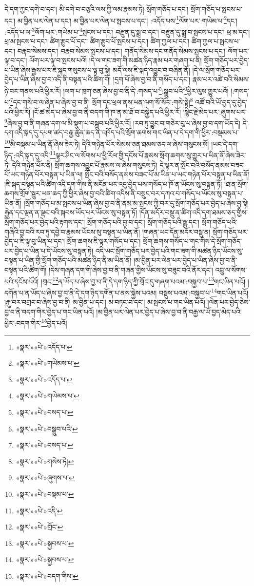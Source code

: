 དེ་དག་ཀྱང་དགེ་བ་དང་། མི་དགེ་བ་བཅུའི་ལས་ཀྱི་ལམ་རྣམས་ཏེ། སྲོག་གཅོད་པ་དང་། སྲོག་གཅོད་པ་སྤངས་པ་དང་། མ་བྱིན་པར་ལེན་པ་དང་། མ་བྱིན་པར་ལེན་པ་སྤངས་པ་དང་། :འདོད་པས་\footnote{«སྣར་»«པེ་»འདོད་པ་}ལོག་པར་:གཡེམ་པ་\footnote{«སྣར་»«པེ་»གཡེམས་པ་}དང་། :འདོད་པ་ལ་\footnote{«སྣར་»«པེ་»འདོད་པ་}ལོག་པར་:གཡེམ་པ་\footnote{«སྣར་»«པེ་»གཡེམས་པ་}སྤངས་པ་དང་། བརྫུན་དུ་སྨྲ་བ་དང་། བརྫུན་དུ་སྨྲ་བ་སྤངས་པ་དང་། ཕྲ་མ་དང་། ཕྲ་མ་སྤངས་པ་དང་། ཚིག་རྩུབ་པོ་དང་། ཚིག་རྩུབ་པོ་སྤངས་པ་དང་། ཚིག་ཀྱལ་པ་དང་། ཚིག་ཀྱལ་པ་སྤངས་པ་དང་། བརྣབ་སེམས་དང་། བརྣབ་སེམས་སྤངས་པ་དང་། གནོད་སེམས་དང་གནོད་སེམས་སྤངས་པ་དང་། ལོག་པར་ལྟ་བ་དང་། ལོག་པར་ལྟ་བ་སྤངས་པའོ། །དེ་ལ་གང་ཟག་གི་མཚན་ཉིད་རྣམ་པར་གཞག་པ་ནི། སྲོག་གཅོད་པར་བྱེད་པ་ཡིན་ཞེས་རྒྱས་པར་ཇི་སྐད་གསུངས་པ་ལྟ་བུ་སྟེ། མདོ་ལས་ཇི་སྐད་འབྱུང་བ་བཞིན་ནོ། །དེ་ལ་སྲོག་གཅོད་པར་བྱེད་པ་ཡིན་ཞེས་བྱ་བ་འདི་ནི་བསྟན་པའི་ཚིག་གོ། །དྲག་པོ་ཞེས་བྱ་བ་ནི་གསོད་པ་དང་། རྣམ་པར་འཚེ་བའི་སེམས་ཉེ་བར་གནས་པའི་ཕྱིར་རོ། །ལག་པ་ཁྲག་ཅན་ཞེས་བྱ་བ་ནི་དེ་:གསད་པ་\footnote{«སྣར་»«པེ་»བསད་པ་}:སྒྲུབ་པའི་\footnote{«སྣར་»«པེ་»བསྒྲུབ་པའི་}ཕྱིར་ལུས་གྱུར་པའོ། །:གསད་པ་\footnote{«སྣར་»«པེ་»བསད་པ་}དང་གསེ་བ་ལ་ཞེན་པ་ཞེས་བྱ་བ་ནི། སྲོག་དང་ཕྲལ་ནས་ཡན་ལག་སོ་སོར་:གསེ་སྟེ།\footnote{«སྣར་»«པེ་»གསེས་ཏེ།} འཚོ་བའི་ཡོ་བྱད་དུ་བྱེད་པའི་ཕྱིར་རོ། །ངོ་ཚ་མེད་པ་ཞེས་བྱ་བ་ནི་བདག་གི་ཁ་ན་མ་ཐོ་བ་བསྐྱེད་པའི་ཕྱིར་རོ། །སྙིང་རྗེ་མེད་པར་:ཞུགས་པར་\footnote{«སྣར་»«པེ་»ཞུགས་པ་}ཞེས་བྱ་བ་ནི་གཞན་དག་ལ་མི་སྡུག་པ་བསྒྲུབ་པའི་ཕྱིར་རོ། །རབ་ཏུ་བྱུང་བ་གཅེར་བུ་པ་ཞེས་བྱ་བ་དག་ཡོད་དེ། དེ་དག་འདི་སྐད་དུ་དཔག་ཚད་བརྒྱ་ཚུན་ཆད་ན་འཁོད་པའི་སྲོག་ཆགས་གང་ཡིན་པ་དེ་དག་གི་ཕྱིར་:བསྡམས་པ་\footnote{«སྣར་»«པེ་»བསྡམ་པ་}མི་བསྡམ་པ་ཡིན་ནོ་ཞེས་ཟེར་ཏེ། དེའི་གཉེན་པོར་སེམས་ཅན་ཐམས་ཅད་ལ་ཞེས་གསུངས་སོ། །ཡང་དེ་དག་ཉིད་:འདི་སྐད་དུ་འདི་\footnote{«སྣར་»«པེ་»འདི་}ལྟར་ཤིང་ལ་སོགས་པ་ཕྱི་རོལ་གྱི་དངོས་པོ་རྣམས་སྲོག་ཆགས་སུ་གྱུར་པ་ཡིན་ནོ་ཞེས་ཟེར་ཏེ། དེའི་གཉེན་པོར་ནི། སྲོག་ཆགས་འབྱུང་པོ་རྣམས་ལ་ཞེས་གསུངས་ཏེ། དེ་ལྟར་ན་སྤོང་བའི་བསོད་ནམས་བཟང་པོ་ཡང་གཉེན་པོར་བསྟན་པ་ཡིན་ལ། སྤོང་བའི་བསོད་ནམས་བཟང་པོ་མ་ཡིན་པ་ཡང་གཉེན་པོར་བསྟན་པ་ཡིན་ནོ། །ཇི་སྐད་བསྟན་པའི་ཚིག་འདི་དག་གིས་ནི་མངོན་པར་འདུ་བྱེད་པས་གསོད་པ་ཁོ་ན་ཡོངས་སུ་བསྟན་ཏོ། །ཐ་ན་སྲོག་ཆགས་གྲོག་སྦུར་ཡན་ཆད་ཀྱི་ཕྱིར་ཞེས་བྱ་བའི་ཚིག་འདིས་ནི་བསྲུང་བར་དཀའ་བ་གསོད་པ་ཡོངས་སུ་བསྟན་པ་ཡིན་ནོ། །སྲོག་གཅོད་པ་མ་སྤངས་པ་ཡིན་ཞེས་བྱ་བ་ནི་ནམ་མ་སྤངས་ཀྱི་བར་དུ་སྲོག་གཅོད་པར་བྱེད་པ་ཞེས་བྱ་སྟེ། རྐྱེན་དང་ལྡན་ན་ལྡང་བའི་སྐབས་ཡོད་པར་ཡོངས་སུ་བསྟན་ཏོ། །དོན་མདོར་བསྡུ་ན་ཚིག་འདི་དག་ཐམས་ཅད་གྱིས་སྲོག་གཅོད་པར་བྱེད་པའི་རྟགས་དང་། སྲོག་གཅོད་པའི་བྱ་བ་དང་། སྲོག་གཅོད་པའི་རྒྱུ་དང་། སྲོག་གཅོད་པའི་གཞིའི་བྱ་བའི་རབ་ཏུ་དབྱེ་བ་རྣམས་ཡོངས་སུ་བསྟན་པ་ཡིན་ནོ། །གཞན་ཡང་དོན་མདོར་བསྡུ་ན། སྲོག་གཅོད་པར་བྱེད་པ་ཇི་ལྟ་བུ་ཡིན་པ་དང་། སྲོག་ཆགས་ཇི་ལྟར་གསོད་པ་དང་། སྲོག་ཆགས་གསོད་པ་གང་གིས་དེ་སྲོག་གཅོད་པར་བྱེད་པ་ཡིན་པ་དེ་ཡོངས་སུ་བསྟན་ཏེ། འདི་ཡང་སྲོག་གཅོད་པར་བྱེད་པའི་གང་ཟག་གི་མཚན་ཉིད་ཡོངས་སུ་བསྟན་པ་ཡིན་གྱི་སྲོག་གཅོད་པའི་མཚན་ཉིད་ནི་མ་ཡིན་ནོ། །མ་བྱིན་པར་ལེན་པར་བྱེད་པ་ཡིན་ཞེས་བྱ་བ་ནི་བསྟན་པའི་ཚིག་གོ། །དེས་གཞན་དག་གི་ཞེས་བྱ་བ་ནི་གཞན་གྱིས་ཡོངས་སུ་བཟུང་བའི་ནོར་དང་། འབྲུ་ལ་སོགས་པའི་དངོས་པོའོ། །གྲང་\footnote{«སྣར་»«པེ་»གྲོང་}ན་ཡོད་པ་ཞེས་བྱ་བ་ནི་དེ་དག་ཉིད་ཀྱི་གྲོང་དུ་གཞག་པའམ་:བསྐྱབ་པ་\footnote{«སྣར་»«པེ་»སྐྱབས་པ་}གང་ཡིན་པའོ། །དགོན་པ་ན་ཡོད་པ་ཞེས་བྱ་བ་ནི་དེ་དག་ཉིད་དགོན་པ་ནས་སྐྱེས་པའམ། བསྡུས་པའམ་:བསྐྱབ་པ་\footnote{«སྣར་»«པེ་»སྐྱབས་པ་}གང་ཡིན་པའོ། །རྐུ་བར་བགྲང་བ་ཞེས་བྱ་བ་ནི། མ་བྱིན་པ་དང་། མ་བཏང་བ་དང་། མ་སྤངས་པ་གང་ཡིན་པའོ། །ལེན་པར་བྱེད་ཅེས་བྱ་བ་ནི་བདག་གིར་བྱེད་པ་གང་ཡིན་པའོ། །མ་བྱིན་པར་ལེན་པར་བྱེད་པ་ཞེས་བྱ་བ་ནི་བརྒྱ་ལ་ཡོ་བྱད་མེད་པའི་ཕྱིར་:བདག་གིར་\footnote{«སྣར་»«པེ་»བདག་གིས་}བྱེད་པའོ། 